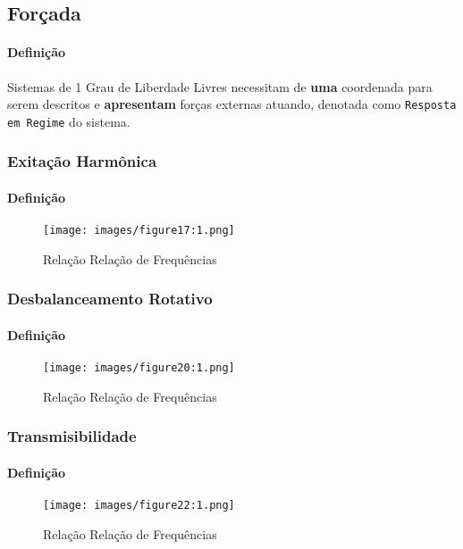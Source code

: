 \documentclass{article}
\begin{document}
\newpage\subsection{Forçada}
    \paragraph{Definição}Sistemas de 1 Grau de Liberdade Livres necessitam de \textbf{uma} coordenada para serem descritos e \textbf{apresentam} forças externas atuando, denotada como \texttt{Resposta em Regime} do sistema.

\subsubsection{Exitação Harmônica}
    \paragraph{Definição}
    \begin{figure}[H]
        \centering
        \texttt{[image: images/figure17:1.png]}
        \caption{Relação Relação de Frequências}
    \end{figure} \noindent

\subsubsection{Desbalanceamento Rotativo}
    \paragraph{Definição}
    \begin{figure}[H]
        \centering
        \texttt{[image: images/figure20:1.png]}
        \caption{Relação Relação de Frequências}
    \end{figure} \noindent

\subsubsection{Transmisibilidade}
    \paragraph{Definição}
    \begin{figure}[H]
        \centering
        \texttt{[image: images/figure22:1.png]}
        \caption{Relação Relação de Frequências}
    \end{figure} \noindent
\end{document}
